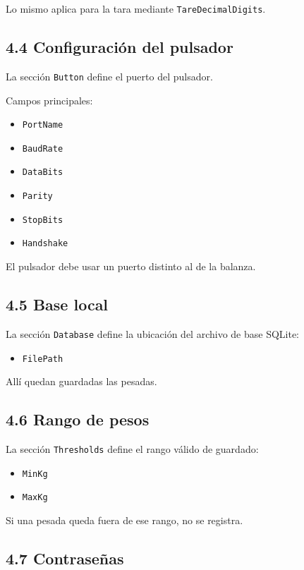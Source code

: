 \documentclass[12pt,a4paper]{article}
\begin{document}
Lo mismo aplica para la tara mediante \texttt{TareDecimalDigits}.

\subsection*{4.4 Configuraci\'on del pulsador}

La secci\'on \texttt{Button} define el puerto del pulsador.

Campos principales:

\begin{itemize}
\item \texttt{PortName}
\item \texttt{BaudRate}
\item \texttt{DataBits}
\item \texttt{Parity}
\item \texttt{StopBits}
\item \texttt{Handshake}
\end{itemize}

El pulsador debe usar un puerto distinto al de la balanza.

\subsection*{4.5 Base local}

La secci\'on \texttt{Database} define la ubicaci\'on del archivo de base SQLite:

\begin{itemize}
\item \texttt{FilePath}
\end{itemize}

All\'i quedan guardadas las pesadas.

\subsection*{4.6 Rango de pesos}

La secci\'on \texttt{Thresholds} define el rango v\'alido de guardado:

\begin{itemize}
\item \texttt{MinKg}
\item \texttt{MaxKg}
\end{itemize}

Si una pesada queda fuera de ese rango, no se registra.

\subsection*{4.7 Contrase\~nas}
\end{document}
